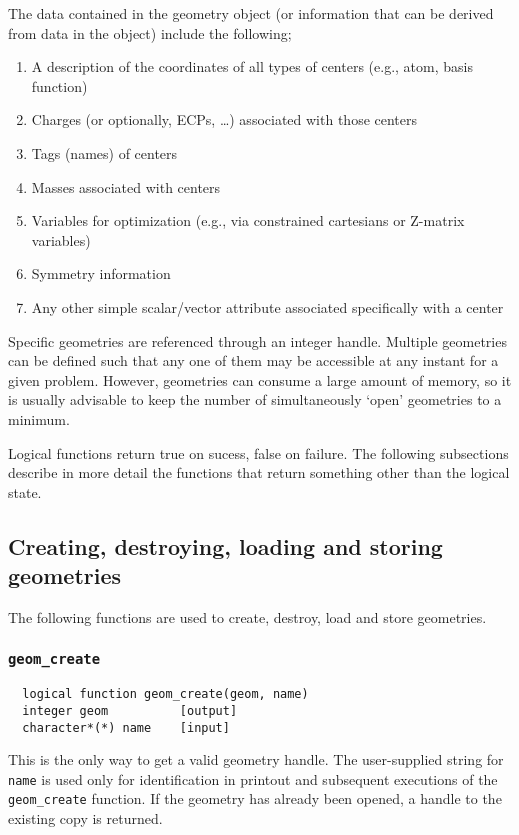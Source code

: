 The data contained in the geometry object (or information that can be derived from
data in the object) include the following;
\begin{enumerate}
\item A description of the coordinates of all types of centers (e.g.,
      atom, basis function)
\item Charges (or optionally, ECPs, \ldots) associated with those centers
\item Tags (names) of centers
\item Masses associated with centers
\item Variables for optimization (e.g., via constrained cartesians
      or Z-matrix variables)
\item Symmetry information
\item Any other simple scalar/vector attribute associated
      specifically with a center
\end{enumerate}

Specific geometries are referenced through an integer handle.   
Multiple geometries can be defined such that any one of them 
may be accessible at any instant for a given problem.  However,
geometries can consume a large amount of memory, so it is usually
advisable to keep the number of simultaneously
`open' geometries to a minimum.

Logical functions return true on sucess, false on failure.  The following
subsections describe in more detail the functions that return something 
other than the
logical state.

\subsection{Creating, destroying, loading and storing geometries}

The following functions are used to create, destroy, load and store geometries.

\subsubsection{{\tt geom\_create}}
\begin{verbatim}
  logical function geom_create(geom, name)
  integer geom          [output]
  character*(*) name    [input]
\end{verbatim}
This is the only way to get a valid geometry handle.  The user-supplied string
for {\tt name}
is used only for identification in printout and subsequent executions of
the \verb+geom_create+ function.
If the geometry has already been opened, a handle to the existing copy is
returned.

